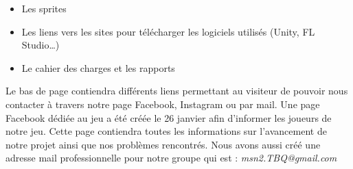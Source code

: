 \documentclass[]{extarticle}
\begin{document}
\begin{spacing}{1.25}
\begin{itemize}
\item Les sprites
\item Les liens vers les sites pour télécharger les logiciels utilisés (Unity, FL Studio…)
\item Le cahier des charges et les rapports
\end {itemize}
\bigbreak
\bigbreak
Le bas de page contiendra différents liens permettant au visiteur de pouvoir nous contacter à travers notre page Facebook, Instagram ou par mail.
\bigbreak
\bigbreak
\bigbreak
Une page Facebook dédiée au jeu a été créée le 26 janvier afin d'informer les joueurs de notre jeu. Cette page contiendra toutes les informations sur l'avancement de notre projet ainsi que nos problèmes rencontrés. 
\bigbreak
Nous avons aussi créé une adresse mail professionnelle pour notre groupe qui est : \textit{msn2.TBQ@gmail.com}
\bigbreak
\bigbreak
\bigbreak
\bigbreak
\bigbreak
\bigbreak
\bigbreak


\end{spacing}
\end{document}
